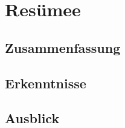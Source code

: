 \chapter{Resümee}
\label{cha:resume}

\section{Zusammenfassung}
\label{sec:summary}

\section{Erkenntnisse}
\label{sec:findings}

\section{Ausblick}
\label{sec:outlook}
